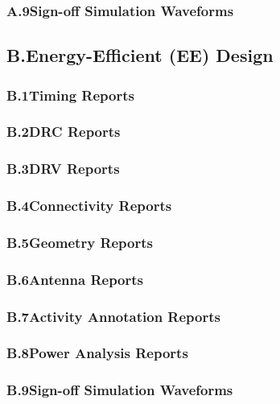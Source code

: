 \documentclass[conference]{IEEEtran}
\begin{document}
\subsubsection*{A.9\quad Sign-off Simulation Waveforms}\label{app:hp:waves}

\subsection*{B.\quad \textcolor{eecolor}{Energy-Efficient (EE) Design}}\label{app:ee}

\subsubsection*{B.1\quad Timing Reports}\label{app:ee:timing}
\subsubsection*{B.2\quad DRC Reports}\label{app:ee:drc}
\subsubsection*{B.3\quad DRV Reports}\label{app:ee:drv}
\subsubsection*{B.4\quad Connectivity Reports}\label{app:ee:conn}
\subsubsection*{B.5\quad Geometry Reports}\label{app:ee:geom}
\subsubsection*{B.6\quad Antenna Reports}\label{app:ee:antenna}
\subsubsection*{B.7\quad Activity Annotation Reports}\label{app:ee:annotation}
\subsubsection*{B.8\quad Power Analysis Reports}\label{app:ee:power}
\subsubsection*{B.9\quad Sign-off Simulation Waveforms}\label{app:ee:waves}
\end{document}
